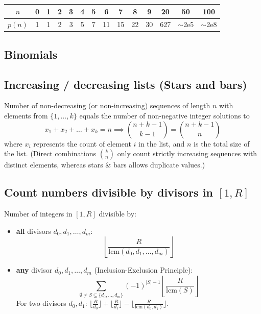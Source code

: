 		\begin{center}
		\begin{tabular}{c|c@{\ }c@{\ }c@{\ }c@{\ }c@{\ }c@{\ }c@{\ }c@{\ }c@{\ }c@{\ }c@{\ }c@{\ }c}
			$n$    & 0 & 1 & 2 & 3 & 4 & 5 & 6  & 7  & 8  & 9  & 20  & 50  & 100 \\ \hline
			$p(n)$ & 1 & 1 & 2 & 3 & 5 & 7 & 11 & 15 & 22 & 30 & 627 & $\mathtt{\sim}$2e5 & $\mathtt{\sim}$2e8 \\
		\end{tabular}
		\end{center}


	\subsection{Binomials}

	\subsection{Increasing / decreasing lists (Stars and bars)}
		Number of non-decreasing (or non-increasing) sequences of length $n$ with elements from $\{1, \dots, k\}$ equals the number of non-negative integer solutions to
		\[ x_1 + x_2 + \dots + x_k = n \implies \binom{n + k - 1}{k - 1} = \binom{n + k - 1}{n} \]
		where $x_i$ represents the count of element $i$ in the list, and $n$ is the total size of the list.
		(Direct combinations $\binom{k}{n}$ only count strictly increasing sequences with distinct elements, whereas stars \& bars allows duplicate values.)

	\subsection{Count numbers divisible by divisors in $[1, R]$}
		Number of integers in $[1, R]$ divisible by:
		\begin{itemize}[noitemsep]
			\item \textbf{all} divisors $d_0, d_1, \dots, d_m$:
			\[ \left\lfloor \frac{R}{\text{lcm}(d_0, d_1, \dots, d_m)} \right\rfloor \]
			\item \textbf{any} divisor $d_0, d_1, \dots, d_m$ (Inclusion-Exclusion Principle):
			\[ \sum_{\emptyset \neq S \subseteq \{d_0, \dots, d_m\}} (-1)^{|S|-1} \left\lfloor \frac{R}{\text{lcm}(S)} \right\rfloor \]
			For two divisors $d_0, d_1$: $\lfloor \frac{R}{d_0} \rfloor + \lfloor \frac{R}{d_1} \rfloor - \lfloor \frac{R}{\text{lcm}(d_0, d_1)} \rfloor$.
		\end{itemize}

